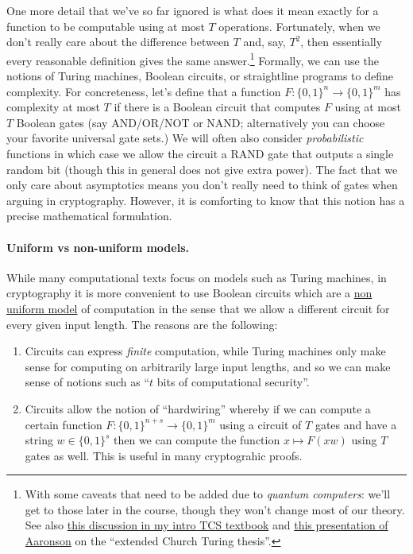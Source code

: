 One more detail that we've so far ignored is what does it mean exactly
for a function to be computable using at most \(T\) operations.
Fortunately, when we don't really care about the difference between
\(T\) and, say, \(T^2\), then essentially every reasonable definition
gives the same answer.\footnote{With some caveats that need to be added
  due to \emph{quantum computers}: we'll get to those later in the
  course, though they won't change most of our theory. See also
  \href{https://introtcs.org/public/lec_04_code_and_data.html\#PECTTsec}{this
  discussion in my intro TCS textbook} and
  \href{https://www.scottaaronson.com/talks/bernays2.ppt}{this
  presentation of Aaronson} on the ``extended Church Turing thesis''.}
Formally, we can use the notions of Turing machines, Boolean circuits,
or straightline programs to define complexity. For concreteness, let's
define that a function \(F:{\{0,1\}}^n\rightarrow{\{0,1\}}^m\) has
complexity at most \(T\) if there is a Boolean circuit that computes
\(F\) using at most \(T\) Boolean gates (say AND/OR/NOT or NAND;
alternatively you can choose your favorite universal gate sets.) We will
often also consider \emph{probabilistic} functions in which case we
allow the circuit a RAND gate that outputs a single random bit (though
this in general does not give extra power). The fact that we only care
about asymptotics means you don't really need to think of gates when
arguing in cryptography. However, it is comforting to know that this
notion has a precise mathematical formulation.

\paragraph{Uniform vs non-uniform models.} While many computational
texts focus on models such as Turing machines, in cryptography it is
more convenient to use Boolean circuits which are a
\href{https://introtcs.org/public/lec_11_running_time.html\#nonuniformcompsec}{non
uniform model} of computation in the sense that we allow a different
circuit for every given input length. The reasons are the following:

\begin{enumerate}
\def\labelenumi{\arabic{enumi}.}
\item
  Circuits can express \emph{finite} computation, while Turing machines
  only make sense for computing on arbitrarily large input lengths, and
  so we can make sense of notions such as ``\(t\) bits of computational
  security''.
\item
  Circuits allow the notion of ``hardwiring'' whereby if we can compute
  a certain function \(F:\{0,1\}^{n+s} \rightarrow \{0,1\}^m\) using a
  circuit of \(T\) gates and have a string \(w \in \{0,1\}^s\) then we
  can compute the function \(x \mapsto F(xw)\) using \(T\) gates as
  well. This is useful in many cryptograhic proofs.
\end{enumerate}

